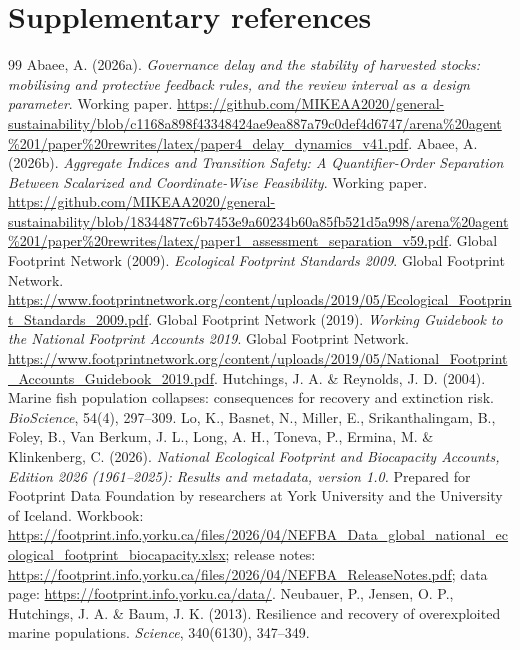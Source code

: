 \documentclass[11pt,a4paper]{article}
\begin{document}
\section*{Supplementary references}
\begin{thebibliography}{99}
\small
{} Abaee, A. (2026a). \emph{Governance delay and the stability of harvested stocks: mobilising and protective feedback rules, and the review interval as a design parameter}. Working paper. \url{https://github.com/MIKEAA2020/general-sustainability/blob/c1168a898f43348424ae9ea887a79c0def4d6747/arena%20agent%201/paper%20rewrites/latex/paper4_delay_dynamics_v41.pdf}.
 Abaee, A. (2026b). \emph{Aggregate Indices and Transition Safety: A Quantifier-Order Separation Between Scalarized and Coordinate-Wise Feasibility}. Working paper. \url{https://github.com/MIKEAA2020/general-sustainability/blob/18344877c6b7453e9a60234b60a85fb521d5a998/arena%20agent%201/paper%20rewrites/latex/paper1_assessment_separation_v59.pdf}.
 Global Footprint Network (2009). \emph{Ecological Footprint Standards 2009}. Global Footprint Network. \url{https://www.footprintnetwork.org/content/uploads/2019/05/Ecological_Footprint_Standards_2009.pdf}.
 Global Footprint Network (2019). \emph{Working Guidebook to the National Footprint Accounts 2019}. Global Footprint Network. \url{https://www.footprintnetwork.org/content/uploads/2019/05/National_Footprint_Accounts_Guidebook_2019.pdf}.
 Hutchings, J. A. \& Reynolds, J. D. (2004). Marine fish population collapses: consequences for recovery and extinction risk. \emph{BioScience}, 54(4), 297--309.
 Lo, K., Basnet, N., Miller, E., Srikanthalingam, B., Foley, B., Van Berkum, J. L., Long, A. H., Toneva, P., Ermina, M. \& Klinkenberg, C. (2026). \emph{National Ecological Footprint and Biocapacity Accounts, Edition 2026 (1961--2025): Results and metadata, version 1.0.} Prepared for Footprint Data Foundation by researchers at York University and the University of Iceland. Workbook: \url{https://footprint.info.yorku.ca/files/2026/04/NEFBA_Data_global_national_ecological_footprint_biocapacity.xlsx}; release notes: \url{https://footprint.info.yorku.ca/files/2026/04/NEFBA_ReleaseNotes.pdf}; data page: \url{https://footprint.info.yorku.ca/data/}.
 Neubauer, P., Jensen, O. P., Hutchings, J. A. \& Baum, J. K. (2013). Resilience and recovery of overexploited marine populations. \emph{Science}, 340(6130), 347--349.

\end{thebibliography}
\end{document}
